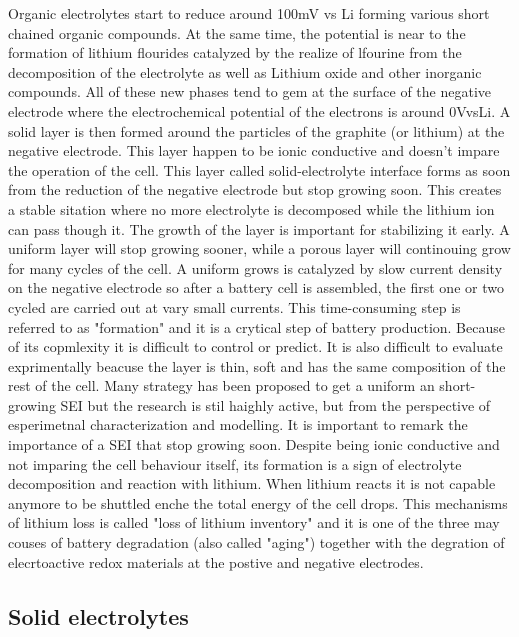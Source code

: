 Organic electrolytes start to reduce around 100mV vs Li forming various short chained organic compounds. At the same time, the potential is near to the formation of lithium flourides catalyzed by the realize of lfourine from the decomposition of the electrolyte as well as Lithium oxide and other inorganic compounds. All of these new phases tend to gem at the surface of the negative electrode where the electrochemical potential of the electrons is around 0VvsLi. A solid layer is then formed around the particles of the graphite (or lithium) at the negative electrode. This layer happen to be ionic conductive and doesn't impare the operation of the cell. This layer called solid-electrolyte interface forms as soon from the reduction of the negative electrode but stop growing soon. This creates a stable sitation where no more electrolyte is decomposed while the lithium ion can pass though it. The growth of the layer is important for stabilizing it early. A uniform layer will stop growing sooner, while a porous layer will continouing grow for many cycles of the cell. A uniform grows is catalyzed by slow current density on the negative electrode so after a battery cell is assembled, the first one or two cycled are carried out at vary small currents. This time-consuming step is referred to as "formation" and it is a crytical step of battery production. Because of its copmlexity it is difficult to control or predict. It is also difficult to evaluate exprimentally beacuse the layer is thin, soft and has the same composition of the rest of the cell. Many strategy has been proposed to get a uniform an short-growing SEI but the research is stil haighly active, but from the perspective of esperimetnal characterization and modelling. It is important to remark the importance of a SEI that stop growing soon. Despite being ionic conductive and not imparing the cell behaviour itself, its formation is a sign of electrolyte decomposition and reaction with lithium. When lithium reacts it is not capable anymore to be shuttled enche the total energy of the cell drops. This mechanisms of lithium loss is called "loss of lithium inventory" and it is one of the three may couses of battery degradation (also called "aging") together with the degration of elecrtoactive redox materials at the postive and negative electrodes.


\subsection{Solid electrolytes}

